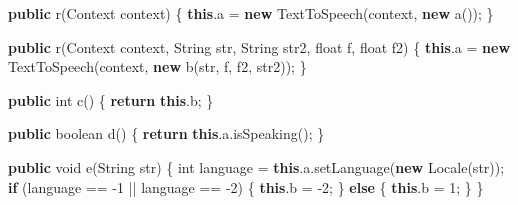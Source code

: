 \documentclass[
]{article}
\newenvironment{Shaded}{}{}
\newcommand{\BuiltInTok}[1]{\textcolor[rgb]{0.00,0.50,0.00}{#1}}
\newcommand{\ControlFlowTok}[1]{\textcolor[rgb]{0.00,0.44,0.13}{\textbf{#1}}}
\newcommand{\DataTypeTok}[1]{\textcolor[rgb]{0.56,0.13,0.00}{#1}}
\newcommand{\DecValTok}[1]{\textcolor[rgb]{0.25,0.63,0.44}{#1}}
\newcommand{\FunctionTok}[1]{\textcolor[rgb]{0.02,0.16,0.49}{#1}}
\newcommand{\KeywordTok}[1]{\textcolor[rgb]{0.00,0.44,0.13}{\textbf{#1}}}
\newcommand{\NormalTok}[1]{#1}
\newcommand{\OperatorTok}[1]{\textcolor[rgb]{0.40,0.40,0.40}{#1}}
\begin{document}
\begin{Shaded}
\begin{Highlighting}[]
    \KeywordTok{public} \FunctionTok{r}\OperatorTok{(}\BuiltInTok{Context}\NormalTok{ context}\OperatorTok{)} \OperatorTok{\{}
        \KeywordTok{this}\OperatorTok{.}\FunctionTok{a} \OperatorTok{=} \KeywordTok{new} \FunctionTok{TextToSpeech}\OperatorTok{(}\NormalTok{context}\OperatorTok{,} \KeywordTok{new} \FunctionTok{a}\OperatorTok{());}
    \OperatorTok{\}}

    \KeywordTok{public} \FunctionTok{r}\OperatorTok{(}\BuiltInTok{Context}\NormalTok{ context}\OperatorTok{,} \BuiltInTok{String}\NormalTok{ str}\OperatorTok{,} \BuiltInTok{String}\NormalTok{ str2}\OperatorTok{,} \DataTypeTok{float}\NormalTok{ f}\OperatorTok{,} \DataTypeTok{float}\NormalTok{ f2}\OperatorTok{)} \OperatorTok{\{}
        \KeywordTok{this}\OperatorTok{.}\FunctionTok{a} \OperatorTok{=} \KeywordTok{new} \FunctionTok{TextToSpeech}\OperatorTok{(}\NormalTok{context}\OperatorTok{,} \KeywordTok{new} \FunctionTok{b}\OperatorTok{(}\NormalTok{str}\OperatorTok{,}\NormalTok{ f}\OperatorTok{,}\NormalTok{ f2}\OperatorTok{,}\NormalTok{ str2}\OperatorTok{));}
    \OperatorTok{\}}

    \KeywordTok{public} \DataTypeTok{int} \FunctionTok{c}\OperatorTok{()} \OperatorTok{\{}
        \ControlFlowTok{return} \KeywordTok{this}\OperatorTok{.}\FunctionTok{b}\OperatorTok{;}
    \OperatorTok{\}}

    \KeywordTok{public} \DataTypeTok{boolean} \FunctionTok{d}\OperatorTok{()} \OperatorTok{\{}
        \ControlFlowTok{return} \KeywordTok{this}\OperatorTok{.}\FunctionTok{a}\OperatorTok{.}\FunctionTok{isSpeaking}\OperatorTok{();}
    \OperatorTok{\}}

    \KeywordTok{public} \DataTypeTok{void} \FunctionTok{e}\OperatorTok{(}\BuiltInTok{String}\NormalTok{ str}\OperatorTok{)} \OperatorTok{\{}
        \DataTypeTok{int}\NormalTok{ language }\OperatorTok{=} \KeywordTok{this}\OperatorTok{.}\FunctionTok{a}\OperatorTok{.}\FunctionTok{setLanguage}\OperatorTok{(}\KeywordTok{new} \BuiltInTok{Locale}\OperatorTok{(}\NormalTok{str}\OperatorTok{));}
        \ControlFlowTok{if} \OperatorTok{(}\NormalTok{language }\OperatorTok{==} \OperatorTok{{-}}\DecValTok{1} \OperatorTok{||}\NormalTok{ language }\OperatorTok{==} \OperatorTok{{-}}\DecValTok{2}\OperatorTok{)} \OperatorTok{\{}
            \KeywordTok{this}\OperatorTok{.}\FunctionTok{b} \OperatorTok{=} \OperatorTok{{-}}\DecValTok{2}\OperatorTok{;}
        \OperatorTok{\}} \ControlFlowTok{else} \OperatorTok{\{}
            \KeywordTok{this}\OperatorTok{.}\FunctionTok{b} \OperatorTok{=} \DecValTok{1}\OperatorTok{;}
        \OperatorTok{\}}
    \OperatorTok{\}}


\end{Highlighting}
\end{Shaded}
\end{document}
